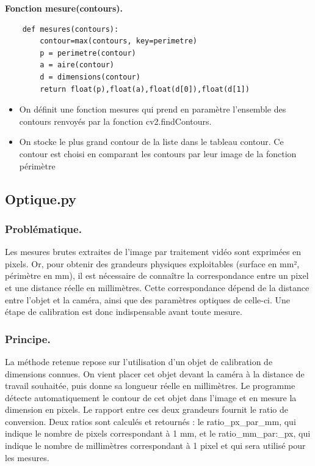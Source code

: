 \documentclass[titlepage]{article}
\begin{document}
	\textbf{Fonction mesure(contours).}
	\begin{lstlisting}
	def mesures(contours):
		contour=max(contours, key=perimetre)
		p = perimetre(contour)
		a = aire(contour)
		d = dimensions(contour)
		return float(p),float(a),float(d[0]),float(d[1])
	\end{lstlisting}
	\begin{itemize}
		\item On définit une fonction mesures qui prend en paramètre l'ensemble des contours renvoyés par la fonction cv2.findContours.
		\item On stocke le plus grand contour de la liste dans le tableau contour. Ce contour est choisi en comparant les contours par leur image de la fonction périmètre
	\end{itemize}
		
	\subsection{Optique.py}
	\subsubsection{Problématique.}
	Les mesures brutes extraites de l'image par traitement vidéo sont exprimées en pixels. Or, pour obtenir des grandeurs physiques exploitables (surface en mm², périmètre en mm), il est nécessaire de connaître la correspondance entre un pixel et une distance réelle en millimètres. Cette correspondance dépend de la distance entre l'objet et la caméra, ainsi que des paramètres optiques de celle-ci. Une étape de calibration est donc indispensable avant toute mesure.
	\subsubsection{Principe.}
	La méthode retenue repose sur l'utilisation d'un objet de calibration de dimensions connues. On vient placer cet objet devant la caméra à la distance de travail souhaitée, puis donne sa longueur réelle en millimètres. Le programme détecte automatiquement le contour de cet objet dans l'image et en mesure la dimension en pixels. Le rapport entre ces deux grandeurs fournit le ratio de conversion. Deux ratios sont calculés et retournés : le ratio\_px\_par\_mm, qui indique le nombre de pixels correspondant à 1 mm, et le ratio\_mm\_par:\_px, qui indique le nombre de millimètres correspondant à 1 pixel et qui sera utilisé pour les mesures.
\end{document}
